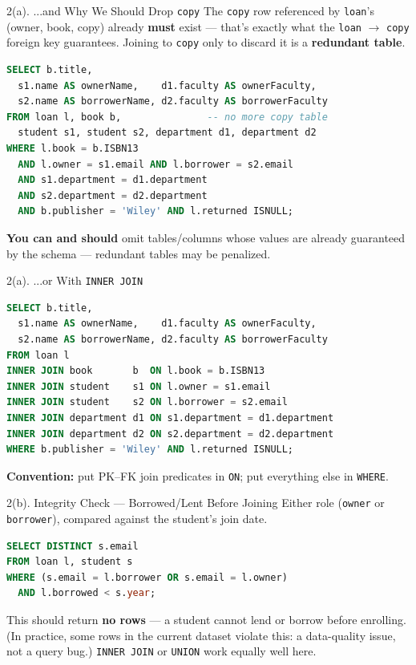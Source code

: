 \documentclass{beamer}
\begin{document}
\begin{frame}[fragile]{2(a). ...and Why We Should Drop \texttt{copy}}
\small
The \texttt{copy} row referenced by \texttt{loan}'s (owner, book, copy) already \textbf{must} exist --- that's exactly what the \texttt{loan} $\to$ \texttt{copy} foreign key guarantees. Joining to \texttt{copy} only to discard it is a \textbf{redundant table}.
\begin{lstlisting}[language=SQL]
SELECT b.title,
  s1.name AS ownerName,    d1.faculty AS ownerFaculty,
  s2.name AS borrowerName, d2.faculty AS borrowerFaculty
FROM loan l, book b,               -- no more copy table
  student s1, student s2, department d1, department d2
WHERE l.book = b.ISBN13
  AND l.owner = s1.email AND l.borrower = s2.email
  AND s1.department = d1.department
  AND s2.department = d2.department
  AND b.publisher = 'Wiley' AND l.returned ISNULL;
\end{lstlisting}
\textbf{You can and should} omit tables/columns whose values are already guaranteed by the schema --- redundant tables may be penalized.
\end{frame}

\begin{frame}[fragile]{2(a). ...or With \texttt{INNER JOIN}}
\small
\begin{lstlisting}[language=SQL]
SELECT b.title,
  s1.name AS ownerName,    d1.faculty AS ownerFaculty,
  s2.name AS borrowerName, d2.faculty AS borrowerFaculty
FROM loan l
INNER JOIN book       b  ON l.book = b.ISBN13
INNER JOIN student    s1 ON l.owner = s1.email
INNER JOIN student    s2 ON l.borrower = s2.email
INNER JOIN department d1 ON s1.department = d1.department
INNER JOIN department d2 ON s2.department = d2.department
WHERE b.publisher = 'Wiley' AND l.returned ISNULL;
\end{lstlisting}
\textbf{Convention:} put PK--FK join predicates in \texttt{ON}; put everything else in \texttt{WHERE}.
\end{frame}

\begin{frame}[fragile]{2(b). Integrity Check --- Borrowed/Lent Before Joining}
\small
Either role (\texttt{owner} or \texttt{borrower}), compared against the student's join date.
\begin{lstlisting}[language=SQL]
SELECT DISTINCT s.email
FROM loan l, student s
WHERE (s.email = l.borrower OR s.email = l.owner)
  AND l.borrowed < s.year;
\end{lstlisting}
This should return \textbf{no rows} --- a student cannot lend or borrow before enrolling. (In practice, some rows in the current dataset violate this: a data-quality issue, not a query bug.) \texttt{INNER JOIN} or \texttt{UNION} work equally well here.
\end{frame}
\end{document}
